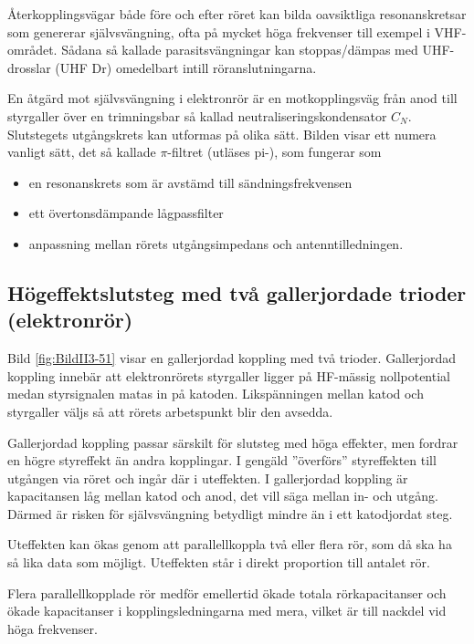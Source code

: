 Återkopplingsvägar både före och efter röret kan bilda oavsiktliga
resonanskretsar som genererar självsvängning, ofta på mycket höga
frekvenser till exempel i VHF-området.
Sådana så kallade parasitsvängningar kan stoppas/dämpas med UHF-drosslar (UHF
Dr) omedelbart intill röranslutningarna.

En åtgärd mot självsvängning i elektronrör är en motkopplingsväg från anod till
styrgaller över en trimningsbar så kallad neutraliseringskondensator \(C_N\).
Slutstegets utgångskrets kan utformas på olika sätt.
Bilden visar ett numera vanligt sätt, det så kallade \(\pi\)-filtret (utläses
pi-), som fungerar som
\begin{itemize}
  \item en resonanskrets som är avstämd till sändningsfrekvensen
  \item ett övertonsdämpande lågpassfilter
  \item anpassning mellan rörets utgångsimpedans och antenntilledningen.
\end{itemize}

\subsection{Högeffektslutsteg med två gallerjordade trioder (elektronrör)}


Bild \ref{fig:BildII3-51} visar en gallerjordad koppling med två trioder.
Gallerjordad koppling innebär att elektronrörets styrgaller ligger på
HF-mässig nollpotential medan styrsignalen matas in på katoden.
Likspänningen mellan katod och styrgaller väljs så att rörets arbetspunkt blir
den avsedda.

Gallerjordad koppling passar särskilt för slutsteg med höga effekter,
men fordrar en högre styreffekt än andra kopplingar.
I gengäld ''överförs'' styreffekten till utgången via röret och ingår där i
uteffekten.
I gallerjordad koppling är kapacitansen låg mellan katod och anod, det vill
säga mellan in- och utgång.
Därmed är risken för självsvängning betydligt mindre än i ett katodjordat steg.

Uteffekten kan ökas genom att parallellkoppla två eller flera rör, som då ska
ha så lika data som möjligt.
Uteffekten står i direkt proportion till antalet rör.

Flera parallellkopplade rör medför emellertid ökade totala rörkapacitanser och 
ökade kapacitanser i kopplingsledningarna med mera, vilket är till nackdel vid
höga frekvenser.

